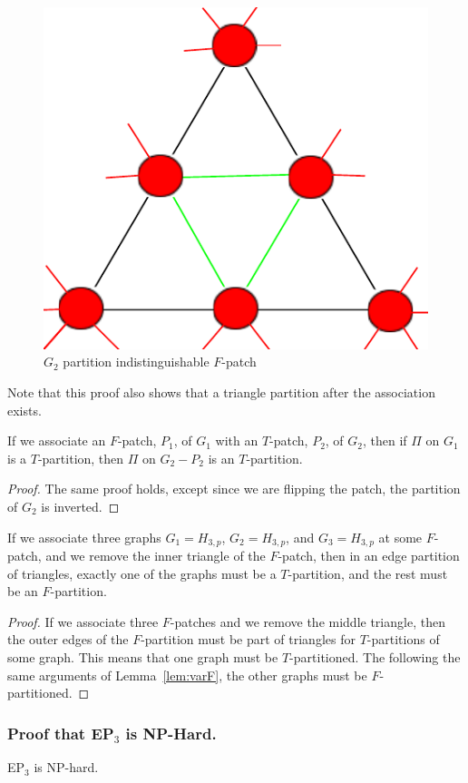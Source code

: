 \documentclass[runningheads,a4paper]{llncs}
\begin{document}
\begin{figure}[t]
\label{fig:Tpatchpartitioned}
\centering
\includegraphics[width=0.2\linewidth]{TpatchPartitioned.pdf}
\caption{$G_2$ partition indistinguishable $F$-patch}
\end{figure}

Note that this proof also shows that a triangle partition after the association exists.

\begin{corollary}
\label{cor:varT}
If we associate an $F$-patch, $P_1$, of $G_1$ with an $T$-patch, $P_2$, of $G_2$, then if $\Pi$ on $G_1$ is a $T$-partition, then $\Pi$ on $G_2-P_2$ is an $T$-partition.
\end{corollary}

\begin{proof}
The same proof holds, except since we are flipping the patch, the partition of $G_2$ is inverted.
\end{proof}

\begin{lemma}
\label{lem:clause}
If we associate three graphs $G_1 = H_{3,p}$, $G_2 = H_{3,p}$, and $G_3 = H_{3,p}$ at some $F$-patch, and we remove the inner triangle of the $F$-patch, then in an edge partition of triangles, exactly one of the graphs must be a $T$-partition, and the rest must be an $F$-partition.
\end{lemma}

\begin{proof}
If we associate three $F$-patches and we remove the middle triangle, then the outer edges of the $F$-partition must be part of triangles for $T$-partitions of some graph. This means that one graph must be $T$-partitioned. The following the same arguments of Lemma~\ref{lem:varF}, the other graphs must be $F$-partitioned.
\end{proof}

\subsubsection{Proof that EP$_3$ is NP-Hard.}

\begin{theorem}
EP$_3$ is NP-hard.
\end{theorem}
\end{document}
